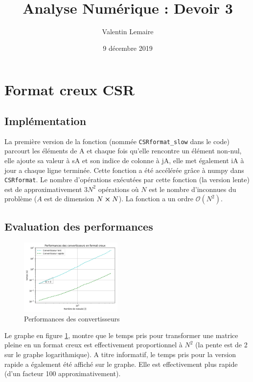 \documentclass[11pt]{article}
\title{Analyse Numérique : Devoir 3}
\author{Valentin Lemaire}
\date{9 décembre 2019}
\begin{document}
\section{Format creux CSR}
\vspace{-10pt}
\subsection{Implémentation}
\vspace{-5pt}
La première version de la fonction (nommée \texttt{CSRformat\_slow} dans le code) parcourt les éléments de A et chaque fois qu'elle rencontre un élément non-nul, elle ajoute sa valeur à sA et son indice de colonne à jA, elle met également iA à jour a chaque ligne terminée. Cette fonction a été accélérée grâce à numpy dans \texttt{CSRformat}. Le nombre d'opérations exécutées par cette fonction (la version lente) est de approximativement $3N^2$ opérations où $N$ est le nombre d'inconnues du problème ($A$ est de dimension $N \cross N$). La fonction a un ordre $\mathcal{O}(N^2)$. \\
\vspace{-12pt}

\subsection{Evaluation des performances}
\begin{figure}
    \vspace{-50pt}
    \includegraphics[width=0.45\textwidth]{csrformatperf.png}
    \vspace{-15pt}
    \caption{Performances des convertisseurs}
    \label{csrformatperf}
\end{figure}


Le graphe en figure \ref{csrformatperf}, montre que le temps pris pour transformer une matrice pleine en un format creux est effectivement proportionnel à $N^2$ (la pente est de 2 sur le graphe logarithmique). A titre informatif, le temps pris pour la version rapide a également été affiché sur le graphe. Elle est effectivement plus rapide (d'un facteur 100 approximativement). 
\end{document}
